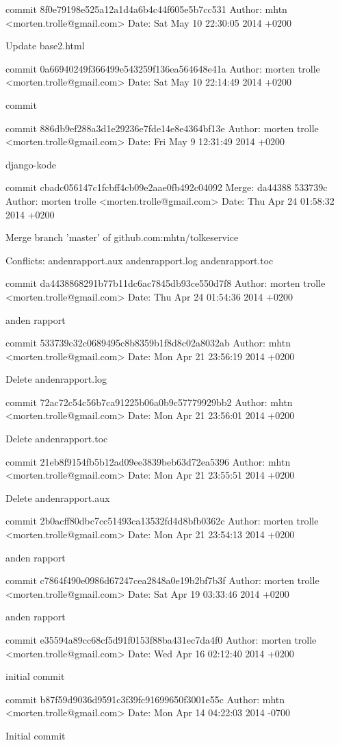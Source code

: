 \documentclass[12pt]{article}   %
\begin{document}
commit 8f0e79198e525a12a1d4a6b4c44f605e5b7cc531
Author: mhtn <morten.trolle@gmail.com>
Date:   Sat May 10 22:30:05 2014 +0200

    Update base2.html

commit 0a66940249f366499e543259f136ea564648e41a
Author: morten trolle <morten.trolle@gmail.com>
Date:   Sat May 10 22:14:49 2014 +0200

    commit

commit 886db9ef288a3d1e29236e7fde14e8e4364bf13e
Author: morten trolle <morten.trolle@gmail.com>
Date:   Fri May 9 12:31:49 2014 +0200

    django-kode

commit cbadc056147c1fcbff4cb09e2aae0fb492c04092
Merge: da44388 533739c
Author: morten trolle <morten.trolle@gmail.com>
Date:   Thu Apr 24 01:58:32 2014 +0200

    Merge branch 'master' of github.com:mhtn/tolkeservice
    
    Conflicts:
    	andenrapport.aux
    	andenrapport.log
    	andenrapport.toc

commit da4438868291b77b11dc6ac7845db93ce550d7f8
Author: morten trolle <morten.trolle@gmail.com>
Date:   Thu Apr 24 01:54:36 2014 +0200

    anden rapport

commit 533739c32c0689495c8b8359b1f8d8c02a8032ab
Author: mhtn <morten.trolle@gmail.com>
Date:   Mon Apr 21 23:56:19 2014 +0200

    Delete andenrapport.log

commit 72ac72c54c56b7ca91225b06a0b9c57779929bb2
Author: mhtn <morten.trolle@gmail.com>
Date:   Mon Apr 21 23:56:01 2014 +0200

    Delete andenrapport.toc

commit 21eb8f9154fb5b12ad09ee3839beb63d72ea5396
Author: mhtn <morten.trolle@gmail.com>
Date:   Mon Apr 21 23:55:51 2014 +0200

    Delete andenrapport.aux

commit 2b0acff80dbc7cc51493ca13532fd4d8bfb0362c
Author: morten trolle <morten.trolle@gmail.com>
Date:   Mon Apr 21 23:54:13 2014 +0200

    anden rapport

commit c7864f490e0986d67247cea2848a0e19b2bf7b3f
Author: morten trolle <morten.trolle@gmail.com>
Date:   Sat Apr 19 03:33:46 2014 +0200

    anden rapport

commit e35594a89cc68cf5d91f0153f88ba431ec7da4f0
Author: morten trolle <morten.trolle@gmail.com>
Date:   Wed Apr 16 02:12:40 2014 +0200

    initial commit

commit b87f59d9036d9591c3f39fc91699650f3001e55c
Author: mhtn <morten.trolle@gmail.com>
Date:   Mon Apr 14 04:22:03 2014 -0700

    Initial commit
\end{document}
